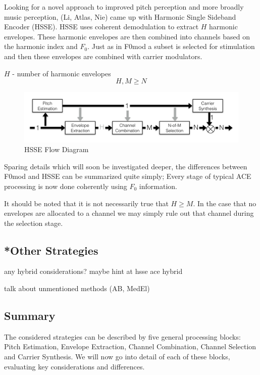 \documentclass [11pt, proquest] {uwthesis}[2015/03/03]
\begin{document}
Looking for a novel approach to improved pitch perception and more broadly music perception, (Li, Atlas, Nie) came up with Harmonic Single Sideband Encoder (HSSE).  HSSE uses coherent demodulation to extract $H$ harmonic envelopes.  These harmonic envelopes are then combined into channels based on the harmonic index and $F_0$.  Just as in F0mod a subset is selected for stimulation and then these envelopes are combined with carrier modulators.

$H$ - number of harmonic envelopes
$$H, M \geq N$$

\begin{figure}[!ht]
  \centering
    \includegraphics[width=1\textwidth]{HSSE_flow_diagramTEMP}   
    \caption{HSSE Flow Diagram}
\end{figure}

Sparing details which will soon be investigated deeper, the differences between F0mod and HSSE can be summarized quite simply;  Every stage of typical ACE processing is now done coherently using $F_0$ information.

It should be noted that it is not necessarily true that $H \geq M$.  In the case that no envelopes are allocated to a channel we may simply rule out that channel during the selection stage.

\subsection{*Other Strategies}

any hybrid considerations?  maybe hint at hsse ace hybrid

talk about unmentioned methods (AB, MedEl)

\subsection{Summary}

The considered strategies can be described by five general processing blocks: Pitch Estimation, Envelope Extraction, Channel Combination, Channel Selection and Carrier Synthesis.  We will now go into detail of each of these blocks, evaluating key considerations and differences.
\end{document}

